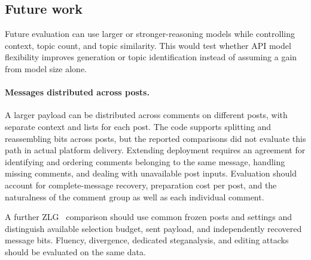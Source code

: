 \subsection{Future work}

Future evaluation can use larger or stronger-reasoning models while controlling context, topic count, and topic similarity. This would test whether API model flexibility improves generation or topic identification instead of assuming a gain from model size alone.

\paragraph{Messages distributed across posts.}
\label{par:cross-post-extension}
A larger payload can be distributed across comments on different posts, with separate context and lists for each post. The code supports splitting and reassembling bits across posts, but the reported comparisons did not evaluate this path in actual platform delivery. Extending deployment requires an agreement for identifying and ordering comments belonging to the same message, handling missing comments, and dealing with unavailable post inputs. Evaluation should account for complete-message recovery, preparation cost per post, and the naturalness of the comment group as well as each individual comment.

A further ZLG~\cite{lin2024zero} comparison should use common frozen posts and settings and distinguish available selection budget, sent payload, and independently recovered message bits. Fluency, divergence, dedicated steganalysis, and editing attacks should be evaluated on the same data.
